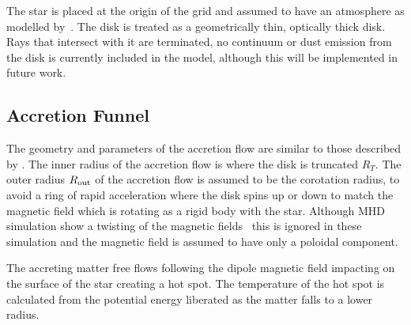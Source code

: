 \documentclass[fleqn,usenatbib]{mnras}
\begin{document}
The star is placed at the origin of the grid and assumed to have an atmosphere as modelled by~\citet{1979ApJS...40....1K}. The disk is treated as a geometrically thin, optically thick disk. Rays that intersect with it are terminated, no continuum or dust emission from the disk is currently included in the model, although this will be implemented in future work.

\subsection{Accretion Funnel}
\label{sec:accretion}
The geometry and parameters of the accretion flow are similar to those described by \citet{1998ApJ...495..385H}. The inner radius of the accretion flow is where the disk is truncated $R_{T}$. The outer radius $R_{\rm out}$ of the accretion flow is assumed to be the corotation radius, to avoid a ring of rapid acceleration where the disk spins up or down to match the magnetic field which is rotating as a rigid body with the star. Although MHD simulation show a twisting of the magnetic fields~\citep[e.g.][]{Uzdensky:2002dg} this is ignored in these simulation and the magnetic field is assumed to have only a poloidal component.

The accreting matter free flows following the dipole magnetic field impacting on the surface of the star creating a hot spot. The temperature of the hot spot is calculated from the potential energy liberated as the matter falls to a lower radius.
\end{document}
